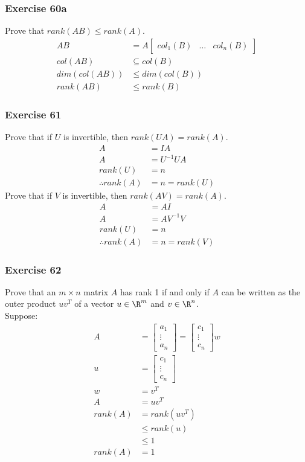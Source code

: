\documentclass{math}
\begin{document}
\subsubsection*{Exercise 60a}
Prove that \( rank(AB)\le rank(A) \).
\begin{align*}
  AB &= A\begin{bmatrix}col_1(B) & \dots & col_n(B)\end{bmatrix} \\
  col(AB) &\subseteq col(B) \\
  dim(col(AB)) &\le dim(col(B)) \\
  rank(AB) &\le rank(B)
\end{align*}

\subsubsection*{Exercise 61}
Prove that if \( U \) is invertible, then \( rank(UA) = rank(A) \).
\begin{align*}
  A &= IA \\
  A &= U^{-1}UA \\
  rank(U) &= n \\
  \therefore rank(A) &= n = rank(U)
\end{align*}
Prove that if \( V \) is invertible, then \( rank(AV) = rank(A) \).
\begin{align*}
  A &= AI \\
  A &= AV^{-1}V \\
  rank(U) &= n \\
  \therefore rank(A) &= n = rank(V)
\end{align*}

\subsubsection*{Exercise 62}
Prove that an \( m\times n \) matrix \( A \) has rank 1 if and only if \( A \)
can be written as the outer product \( uv^T \) of a vector \( u\in\R^m \) and
\( v\in\R^n \). \\
Suppose:
\begin{align*}
  A &= \begin{bmatrix}a_1 \\ \vdots \\ a_n\end{bmatrix}
    = \begin{bmatrix}c_1 \\ \vdots \\ c_n\end{bmatrix}w \\
  u &= \begin{bmatrix}c_1 \\ \vdots \\ c_n\end{bmatrix} \\
  w &= v^T \\
  A &= uv^T \\
  rank(A) &= rank(uv^T) \\
  &\le rank(u) \\
  &\le 1 \\
  rank(A) &= 1
\end{align*}
\end{document}

